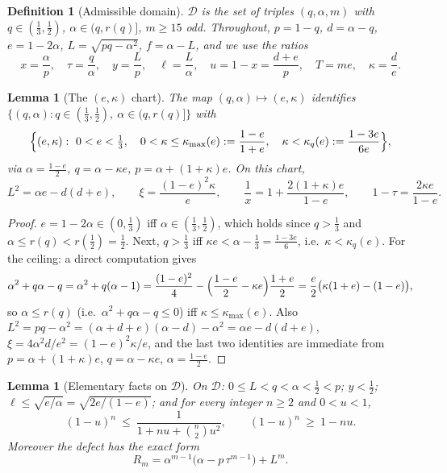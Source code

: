 \documentclass[11pt]{article}
\newtheorem{lemma}[theorem]{Lemma}
\newtheorem{definition}[theorem]{Definition}
\begin{document}
\begin{definition}[Admissible domain]\label{def:domain}
$\mathcal D$ is the set of triples $(q,\alpha,m)$ with $q\in(\tfrac13,\tfrac12)$,
$\alpha\in(q,r(q)]$, $m\ge15$ odd.  Throughout, $p=1-q$, $d=\alpha-q$,
$e=1-2\alpha$, $L=\sqrt{pq-\alpha^2}$, $f=\alpha-L$, and we use the ratios
\[
        x=\frac\alpha p,\quad
        \tau=\frac q\alpha,\quad
        y=\frac Lp,\quad
        \ell=\frac L\alpha,\quad
        u=1-x=\frac{d+e}{p},\quad
        T=me,\quad
        \kappa=\frac de .
\]
\end{definition}

\begin{lemma}[The $(e,\kappa)$ chart]\label{lem:chart}
The map $(q,\alpha)\mapsto(e,\kappa)$ identifies
$\{(q,\alpha):q\in(\tfrac13,\tfrac12),\ \alpha\in(q,r(q)]\}$ with
\[
        \Bigl\{(e,\kappa):\ 0<e<\tfrac13,\quad
        0<\kappa\le\kappa_{\max}(e):=\frac{1-e}{1+e},\quad
        \kappa<\kappa_q(e):=\frac{1-3e}{6e}\Bigr\},
\]
via $\alpha=\frac{1-e}2$, $q=\alpha-\kappa e$, $p=\alpha+(1+\kappa)e$.  On this
chart,
\[
        L^2=\alpha e-d(d+e),
        \qquad
        \xi=\frac{(1-e)^2\kappa}{e},
        \qquad
        \frac1x=1+\frac{2(1+\kappa)e}{1-e},
        \qquad
        1-\tau=\frac{2\kappa e}{1-e}.
\]
\end{lemma}

\begin{proof}
$e=1-2\alpha\in(0,\tfrac13)$ iff $\alpha\in(\tfrac13,\tfrac12)$, which holds
since $q>\tfrac13$ and $\alpha\le r(q)<r(\tfrac12)=\tfrac12$.  Next,
$q>\tfrac13$ iff $\kappa e<\alpha-\tfrac13=\frac{1-3e}6$, i.e.\
$\kappa<\kappa_q(e)$.  For the ceiling: a direct computation gives
\[
        \alpha^2+q\alpha-q
        =\alpha^2+q(\alpha-1)
        =\frac{(1-e)^2}4-\Bigl(\frac{1-e}2-\kappa e\Bigr)\frac{1+e}2
        =\frac e2\bigl(\kappa(1+e)-(1-e)\bigr),
\]
so $\alpha\le r(q)$ (i.e.\ $\alpha^2+q\alpha-q\le0$) iff
$\kappa\le\kappa_{\max}(e)$.  Also
$L^2=pq-\alpha^2=(\alpha+d+e)(\alpha-d)-\alpha^2=\alpha e-d(d+e)$,
$\xi=4\alpha^2d/e^2=(1-e)^2\kappa/e$, and the last two identities are
immediate from $p=\alpha+(1+\kappa)e$, $q=\alpha-\kappa e$,
$\alpha=\frac{1-e}2$.
\end{proof}

\begin{lemma}[Elementary facts on $\mathcal D$]\label{lem:elementary}
On $\mathcal D$: $0\le L<q<\alpha<\tfrac12<p$; $y<\tfrac12$;
$\ell\le\sqrt{e/\alpha}=\sqrt{2e/(1-e)}$; and for every integer $n\ge2$ and
$0<u<1$,
\begin{equation}\label{eq:E-a}
        (1-u)^n\ \le\ \frac1{1+nu+\binom n2u^2},
        \qquad
        (1-u)^n\ \ge\ 1-nu .
\end{equation}
Moreover the defect has the exact form
\begin{equation}\label{eq:defect-form}
        R_m=\alpha^{m-1}\bigl(\alpha-p\,\tau^{m-1}\bigr)+L^m .
\end{equation}
\end{lemma}
\end{document}

